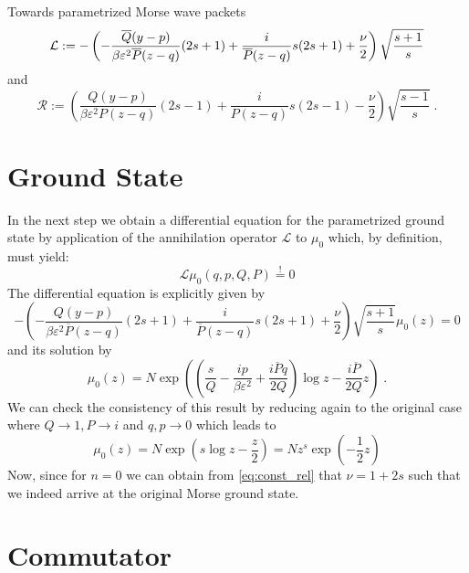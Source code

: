 \begin{chapter}{Towards parametrized Morse wave packets}
\begin{equation}
    \label{eq:param_lop}
    \mathcal{L}:=-\left(-\frac{\overline{Q}(y-p)}{\beta\varepsilon^2 \overline{P}(z-q)}(2s+1)+\frac{i}{\overline{P}(z-q)}s(2s+1)+\frac{\nu}{2} \right)\sqrt{\frac{s+1}{s}}\\
\end{equation}
 and 
\begin{equation}
    \label{eq:param_rop}
    \mathcal{R}:=\left(\frac{Q(y-p)}{\beta\varepsilon^2 P(z-q) }(2s-1)+\frac{i}{P(z-q)}s(2s-1)-\frac{\nu}{2} \right)\sqrt{\frac{s-1}{s}}\;.
\end{equation}

\section{Ground State} %
\label{sec:Ground State}
In the next step we obtain a differential equation for the parametrized ground state by application of the annihilation operator $\mathcal{L}$
to $\mu_0$ which, by definition, must yield:
\begin{equation}
    \mathcal{L}\mu_0(q,p,Q,P)\stackrel{!}{=}0
\end{equation}
The differential equation is explicitly given by
\begin{equation}
    -\left(-\frac{Q(y-p)}{\beta\varepsilon^2\overline{P}(z-q)}(2s+1)+\frac{i}{\overline{P}(z-q)}s(2s+1)+\frac{\nu}{2} \right)\sqrt{\frac{s+1}{s}}
    \mu_0(z)=0
\end{equation}
and its solution by
\begin{equation}
    \mu_0(z)=N\exp\left(\left(\frac{s}{Q}-\frac{ip}{\beta\varepsilon^2}+\frac{i\overline{P}q}{2Q}\right)\log z-\frac{i\overline{P}}{2Q}z \right)\; .
\end{equation}
We can check the consistency of this result by reducing again to the original case where $Q\to 1, P\to i$ and $q,p \to 0$ which leads to
\begin{equation}
    \mu_0(z)=N\exp\left(s\log z-\frac{z}{2}\right)=Nz^s\exp\left(-\frac{1}{2}z\right)
\end{equation}
Now, since for $n=0$ we can obtain from \eqref{eq:const_rel} that $\nu=1+2s$ such that we indeed arrive at the original Morse ground state.


\section{Commutator} %
\label{sec:Commutator}


\end{chapter}

